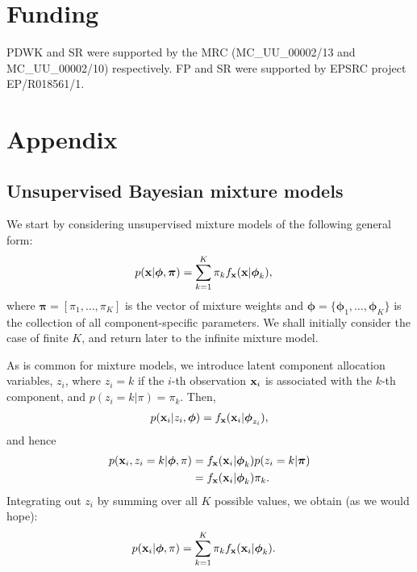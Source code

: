 \documentclass[12pt]{article}
\begin{document}
\section*{Funding}
PDWK and SR were supported by the MRC (MC\_UU\_00002/13 and MC\_UU\_00002/10) respectively.  FP and SR were supported by EPSRC project EP/R018561/1.

\section{Appendix}





\subsection{Unsupervised Bayesian mixture models}
We start by considering unsupervised mixture models of the following general form:
\begin{align}
p({\bf x}|\boldsymbol{\phi}, \boldsymbol{\pi}) & = \sum_{k=1}^K \pi_k f_{\bf x}({\bf x}|\boldsymbol{\phi}_k),
\end{align}
where $\boldsymbol{\pi} = [\pi_1, \ldots, \pi_K]$ is the vector of mixture weights and $\boldsymbol{\phi} = \{\boldsymbol{\phi}_1, \ldots, \boldsymbol{\phi}_K\}$ is the collection of all component-specific parameters.  We shall initially consider the case of finite $K$, and return later to the infinite mixture model. 

As is common for mixture models, we introduce latent component allocation variables, $z_i$, where $z_i = k$ if the $i$-th observation ${\bf x}_i $ is associated with the $k$-th component, and $p(z_i = k| \pi) = \pi_k$.  Then, 
\begin{align}
p({\bf x}_i|z_i, \boldsymbol{\phi}) = f_{\bf x}({\bf x}_i | \boldsymbol{\phi}_{z_i}),
\end{align}
and hence
\begin{align}
p({\bf x}_i,z_i = k| \boldsymbol{\phi}, \pi) &= f_{\bf x}({\bf x}_i | \boldsymbol{\phi}_{k})p(z_i = k| \boldsymbol{\pi})\\
&=f_{\bf x}({\bf x}_i | \boldsymbol{\phi}_{k})\pi_k.
\end{align}
Integrating out $z_i$ by summing over all $K$ possible values, we obtain (as we would hope):
\begin{align}
p({\bf x}_i| \boldsymbol{\phi}, \pi) &= \sum_{k = 1}^K \pi_k f_{\bf x}({\bf x}_i | \boldsymbol{\phi}_{k}).
\end{align}
\end{document}
